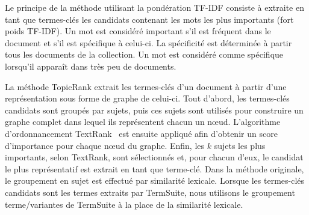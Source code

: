     Le principe de la méthode utilisant la pondération TF-IDF consiste à
    extraite en tant que termes-clés les candidats contenant les mots les plus
    importants (fort poids TF-IDF). Un mot est considéré important s'il est
    fréquent dans le document et s'il est spécifique à celui-ci. La spécificité
    est déterminée à partir tous les documents de la collection. Un mot est
    considéré comme spécifique lorsqu'il apparaît dans très peu de documents.

    La méthode TopicRank extrait les termes-clés d'un document à partir d'une
    représentation sous forme de graphe de celui-ci. Tout d'abord, les
    termes-clés candidats sont groupés par sujets, puis ces sujets sont utilisés
    pour construire un graphe complet dans lequel ils représentent chacun un
    n\oe{}ud. L'algorithme d'ordonnancement
    TextRank~\cite{mihalcea2004textrank} est ensuite appliqué afin d'obtenir un
    score d'importance pour chaque n\oe{}ud du graphe. Enfin, les $k$ sujets les
    plus importants, selon TextRank, sont sélectionnés et, pour chacun d'eux, le
    candidat le plus représentatif est extrait en tant que terme-clé. Dans la
    méthode originale, le groupement en sujet est effectué par similarité
    lexicale. Lorsque les termes-clés candidats sont les termes extraits par
    TermSuite, nous utilisons le groupement terme/variantes de TermSuite à la
    place de la similarité lexicale.


